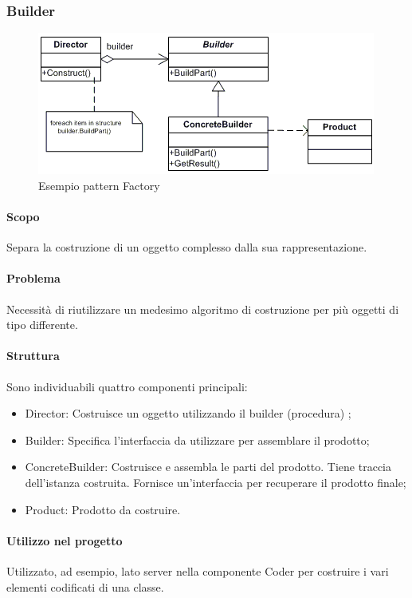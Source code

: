 \documentclass[../PianoDiQualifica.tex]{subfiles}
\begin{document}
			\subsubsection{Builder}
				\begin{figure}[H] \label{fig:Builder}
					\centering
					\includegraphics[scale=0.8]{Immagini/Builder.png}
					\caption{Esempio pattern Factory}
				\end{figure}
				\paragraph{Scopo\\}
					Separa la costruzione di un oggetto complesso dalla
					sua rappresentazione.
				\paragraph{Problema\\}
					Necessità di riutilizzare un medesimo algoritmo di
					costruzione per più oggetti di tipo differente.
				\paragraph{Struttura\\}
					Sono individuabili quattro componenti principali:
					\begin{itemize}
						\item Director: Costruisce un oggetto utilizzando il builder (procedura) ;
						\item Builder: Specifica l’interfaccia da utilizzare per assemblare il prodotto;
						\item ConcreteBuilder: Costruisce e assembla le parti del
						prodotto. Tiene traccia dell’istanza costruita. Fornisce un’interfaccia per recuperare il prodotto finale;
						\item Product: Prodotto da costruire.
					\end{itemize}
				\paragraph{Utilizzo nel progetto\\}
					Utilizzato, ad esempio, lato server nella componente Coder per costruire i vari elementi codificati di una classe.
\end{document}
